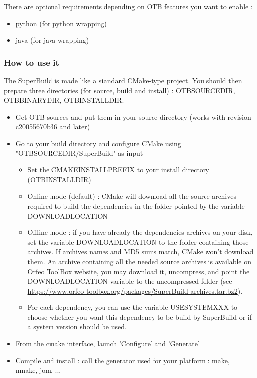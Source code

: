 There are optional requirements depending on OTB features you want to enable :
\begin{itemize}
	\item python (for python wrapping)
    \item java (for java wrapping) 
\end{itemize}

\subsubsection{How to use it}

The SuperBuild is made like a standard CMake-type project. You should then prepare three directories (for source, build and install) :
OTB\textunderscore SOURCE\textunderscore DIR, OTB\textunderscore BINARY\textunderscore DIR, OTB\textunderscore INSTALL\textunderscore DIR.

\begin{itemize}
	\item Get OTB sources and put them in your source directory (works with revision c20055670b36 and later)
    \item Go to your build directory and configure CMake using "OTB\textunderscore SOURCE\textunderscore DIR/SuperBuild" as input
    \begin{itemize}
        \item Set the CMAKE\textunderscore INSTALL\textunderscore PREFIX to your install directory (OTB\textunderscore INSTALL\textunderscore DIR)
        \item Online mode (default) : CMake will download all the source archives required to build the dependencies in the folder pointed by the variable DOWNLOAD\textunderscore LOCATION
        \item Offline mode : if you have already the dependencies archives on your disk, set the variable DOWNLOAD\textunderscore LOCATION to the folder containing those archives. If archives names and MD5 sums match, CMake won't download them. An archive containing all the needed source archives is available on Orfeo ToolBox website, you may download it, uncompress, and point the DOWNLOAD\textunderscore LOCATION variable to the uncompressed folder (see \url{https://www.orfeo-toolbox.org/packages/SuperBuild-archives.tar.bz2}).
        \item For each dependency, you can use the variable USE\textunderscore SYSTEM\textunderscore XXX to choose whether you want this dependency to be build by SuperBuild or if a system version should be used. 
    \end{itemize}
    \item From the cmake interface, launch 'Configure' and 'Generate'
    \item Compile and install : call the generator used for your platform : make, nmake, jom, ... 
\end{itemize}

